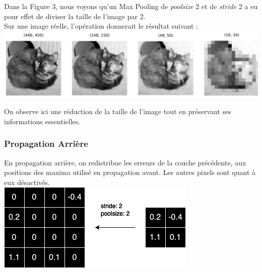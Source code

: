 \begin{multicols}{2}
Dans la Figure 3, nous voyons qu'un Max Pooling de \textit{poolsize} 2 et 
de \textit{stride} 2 a eu pour effet de diviser la taille de l'image par 2.\\

Sur une image réelle, l'opération donnerait le résultat suivant : \\

\includegraphics[width=\columnwidth]{images/maxpooling2.png}
\hfill\break

On observe ici une réduction de la taille de l’image tout en préservant ses 
informations essentielles.

\subsubsection{Propagation Arrière}

En propagation arrière, on redistribue les erreurs de la couche précédente, aux positions des
maxima utilisé en propagation avant. Les autres pixels sont quant à eux désactivés. \\

\includegraphics[width=\columnwidth]{images/backwardpooling.png}
\hfill\break

\end{multicols}